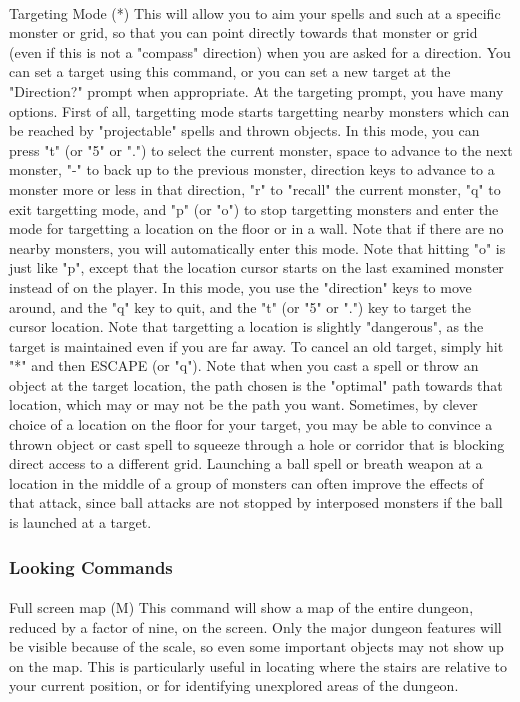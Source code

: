 \paragraph{}Targeting Mode (*) This will allow you to aim your spells
and such at a specific monster or grid, so that you can point directly
towards that monster or grid (even if this is not a "compass" direction)
when you are asked for a direction. You can set a target using this
command, or you can set a new target at the "Direction?" prompt when
appropriate. At the targeting prompt, you have many options. First of
all, targetting mode starts targetting nearby monsters which can be
reached by "projectable" spells and thrown objects. In this mode, you
can press "t" (or "5" or ".") to select the current monster, space to
advance to the next monster, "-" to back up to the previous monster,
direction keys to advance to a monster more or less in that direction,
"r" to "recall" the current monster, "q" to exit targetting mode, and
"p" (or "o") to stop targetting monsters and enter the mode for
targetting a location on the floor or in a wall. Note that if there are
no nearby monsters, you will automatically enter this mode.  Note that
hitting "o" is just like "p", except that the location cursor starts on
the last examined monster instead of on the player.  In this mode, you
use the "direction" keys to move around, and the "q" key to quit, and
the "t" (or "5" or ".") key to target the cursor location. Note that
targetting a location is slightly "dangerous", as the target is
maintained even if you are far away. To cancel an old target, simply hit
"*" and then ESCAPE (or "q"). Note that when you cast a spell or throw
an object at the target location, the path chosen is the "optimal" path
towards that location, which may or may not be the path you want.
Sometimes, by clever choice of a location on the floor for your target,
you may be able to convince a thrown object or cast spell to squeeze
through a hole or corridor that is blocking direct access to a different
grid. Launching a ball spell or breath weapon at a location in the
middle of a group of monsters can often improve the effects of that
attack, since ball attacks are not stopped by interposed monsters if the
ball is launched at a target.
        
\subsubsection{Looking Commands} 
\paragraph{}Full screen map (M) This
command will show a map of the entire dungeon, reduced by a factor of
nine, on the screen. Only the major dungeon features will be visible
because of the scale, so even some important objects may not show up on
the map. This is particularly useful in locating where the stairs are
relative to your current position, or for identifying unexplored areas
of the dungeon.

